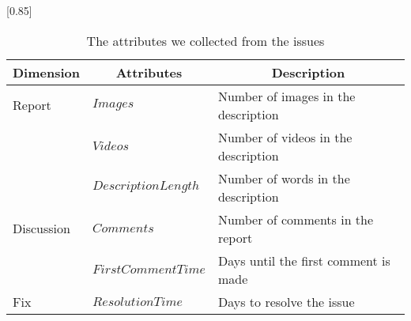 
\begin{table}[t]
    \begin{center}
    \caption{The attributes we collected from the issues}
    \scalebox{0.85}[0.85]{
    \begin{tabular}{llp{4.6cm}} 
        \toprule
        \multicolumn{1}{c}{\textbf{Dimension}}&\multicolumn{1}{c}{\textbf{Attributes}} & \multicolumn{1}{c}{\textbf{Description}} \\ 
        \midrule
        Report&$Images$ & Number of images in the description \\
        &$Videos$ & Number of videos in the description \\
        &$DescriptionLength$ & Number of words in the description\\
        \hline
        Discussion&$Comments$ & Number of comments in the report\\
        &$FirstCommentTime$ & Days until the first comment is made \\
        
        \hline
        Fix&$ResolutionTime$ & Days to resolve the issue \\

        \bottomrule
    \end{tabular}
    }
    \label{tab:issue-attr}
    \end{center}
\end{table}
